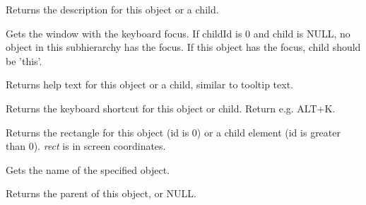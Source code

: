 
Returns the description for this object or a child.

\label{wxaccessiblegetfocus}


Gets the window with the keyboard focus. If childId is 0 and child is NULL, no object in
this subhierarchy has the focus. If this object has the focus, child should be 'this'.

\label{wxaccessiblegethelptext}


Returns help text for this object or a child, similar to tooltip text.

\label{wxaccessiblegetkeyboardshortcut}


Returns the keyboard shortcut for this object or child.
Return e.g. ALT+K.

\label{wxaccessiblegetlocation}


Returns the rectangle for this object (id is 0) or a child element (id is greater than 0).
{\it rect} is in screen coordinates.

\label{wxaccessiblegetname}


Gets the name of the specified object.

\label{wxaccessiblegetparent}


Returns the parent of this object, or NULL.

\label{wxaccessiblegetrole}


